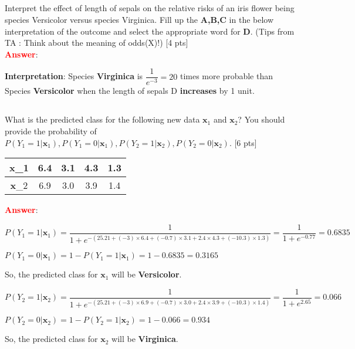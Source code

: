 \documentclass{homework}
\begin{document}
    
    \subsection{}
    Interpret the effect of length of sepals on the relative risks of an iris flower being species Versicolor versus species Virginica. Fill up the \textbf{A,B,C} in the below interpretation of the outcome and select the appropriate word for \textbf{D}. (Tips from TA : Think about the meaning of odds(X)!) [4 pts] \\

    \textbf{\textcolor{red}{Answer}}: 
    
    \textbf{Interpretation}: Species \textbf{Virginica} is $\dfrac{1}{e^{-3}} = 20$ times more probable than Species \textbf{Versicolor} when the length of sepals D \textbf{increases} by 1 unit.
    
    \subsection{}
    What is the predicted class for the following new data $\mathbf{x}_1$ and $\mathbf{x}_2$? You should provide the probability of $P(Y_{1}=1|\mathbf{x}_{1}),P(Y_{1}=0|\mathbf{x}_{1}),P(Y_{2}=1|\mathbf{x}_{2}),P(Y_{2}=0|\mathbf{x}_{2}).$ [6 pts]
    \begin{table}[!h]
    \begin{center}
    \begin{tabular}{|c|c|c|c|c|}
    \hline
    \textbf{x}_{1} & 6.4  & 3.1  & 4.3  & 1.3   \\ \hline
    \textbf{x}_{2}  & 6.9  & 3.0  & 3.9  & 1.4  \\ \hline
    \end{tabular}
    \end{center}
    \end{table}
    
    \textbf{\textcolor{red}{Answer}}: 
    
    \large{$    P(Y_{1}=1|\mathbf{x}_{1}) = \dfrac{1}{1+ e^{-(25.21 + (-3)\times6.4 + (-0.7)\times3.1 + 2.4\times4.3 + (-10.3)\times1.3)}} = \dfrac{1}{1+e^{-0.77}} = 0.6835 
    $}
    
    \large{$P(Y_{1}=0|\mathbf{x}_{1}) = 1 - P(Y_{1}=1|\mathbf{x}_{1}) = 1 - 0.6835 = 0.3165$}
    
    So, the predicted class for $\mathbf{x}_1$ will be \textbf{Versicolor}.
    
       \large{$    P(Y_{2}=1|\mathbf{x}_{2}) = \dfrac{1}{1+ e^{-(25.21 + (-3)\times6.9 + (-0.7)\times3.0 + 2.4\times3.9 + (-10.3)\times1.4)}} = \dfrac{1}{1+e^{2.65}} = 0.066 
    $}
    
    \large{$P(Y_{2}=0|\mathbf{x}_{2}) = 1 - P(Y_{2}=1|\mathbf{x}_{2}) = 1 - 0.066 = 0.934$}
    
    So, the predicted class for $\mathbf{x}_2$ will be \textbf{Virginica}.
    
    
    
    

    \vspace{10mm}   
    
     
  
\end{document}
